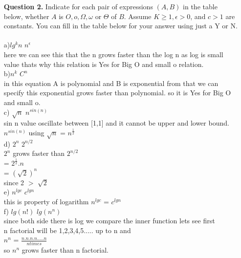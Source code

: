 \documentclass[10pt,letterpaper]{article}
\begin{document}
\begin{itemize}
\item[{\bf Question 2.}]
Indicate for each pair of expressions $(A,B)$ in the table below, whether $A$ is $O, o, \Omega, \omega$ or $\Theta$ of $B$. Assume $K \ge 1, \epsilon > 0$, and $c > 1$ are constants. You can fill in the table below for your answer using just a Y or N. \\ \\
a)$lg^kn$ $n^\epsilon$ \\
here we can see this that the n grows faster than the log n as log is small value thats why this relation is Yes for Big O and small o relation.\\

b)$n^k$ $C^n$\\
in this equation A is polynomial and B is exponential from that we can specify this exponential grows faster than polynomial. so it is Yes for Big O and small o.\\

c) $\sqrt{n}$ $n^{sin(n)}$\\
sin n value oscillate between [1,1] and it cannot be upper and lower bound.\\
$n^{sin(n)}$ using $\sqrt{n}$ = $n^\frac{1}{2}$\\

d) $2^n$ $2^{n/2}$\\
$2^n$ grows faster than $2^{n/2}$ \\

= $2^{\frac{1}{2}} . {n}$\\

= $(\sqrt{2})^n$ \\

since 2 $>$ $\sqrt{2}$\\

e) $n^{lgc}$ $c^{lgn}$\\
this is property of logarithm $n^{lgc}$ = $c^{lgn}$\\

f) $lg(n!)$ $lg(n^n)$\\
since both side there is log we compare the inner function lets see first \\
n factorial will be 1,2,3,4,5..... up to n and \\
$n^n$  = $\frac{n.n.n.n.....n}{n times}$ \\

so $n^n$ grows faster than n factorial.\\


\end{itemize}
\end{document}
